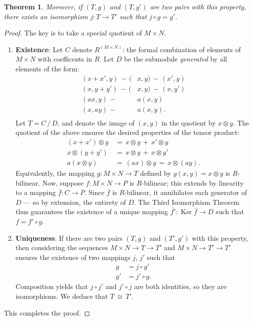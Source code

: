 \documentclass[11pt]{article}
\newtheorem{theorem}{Theorem}
\newcommand{\Ker}{\operatorname{Ker}}
\begin{document}
\begin{adjustwidth}{0.5cm}{}
\begin{theorem}
    Moreover, if $(T, g)$ and $(T, g')$ are two pairs with this property, there exists an isomorphism $j : T \to T'$ such that $j \circ g = g'$.
  \end{theorem}
  \begin{proof}
    The key is to take a special quotient of $M \times N$.
    \begin{enumerate}
      \item \textbf{Existence}: Let $C$ denote $R^{(M \times N)}$: the formal combination of elements of $M \times N$ with coefficents in $R$. Let $D$ be the submodule \textit{generated} by all elements of the form:
      \begin{align*}
        (x + x', y) \, - \, (& x, y) \, - \, (x', y) \\
        (x, y + y') \, - \, (& x, y) \, - \, (x, y') \\
        (ax, y) \, - \, & a(x, y) \\
        (x, ay) \, - \, & a(x, y). \\
      \end{align*}
      Let $T = C \, / \, D$, and denote the image of $(x, y)$ in the quotient by $x \otimes y$. The quotient of the above ensures the desired properties of the tensor product:
      \begin{align*}
        (x + x') \otimes y \, &= \, x \otimes y \, + \, x' \otimes y \\
        x \otimes (y + y') \, &= \, x \otimes y \, + \, x \otimes y' \\
            a(x \otimes y) \, &= \, (ax) \otimes y \, = \, x \otimes (ay).
      \end{align*}
      Equivalently, the mapping $g : M \times N \to T$ defined by $g(x, y) = x \otimes y$ is $R$-bilinear.
      Now, suppose $f : M \times N \to P$ is $R$-bilinear; this extends by linearity to a mapping $\bar{f} : C \to P$. Since $\bar{f}$ is $R$-bilinear, it annihilates each generator of $D$ --- so by extension, the entirety of $D$. The Third Isomorphism Theorem thus guarantees the existence of a unique mapping $\bar{f'} : \Ker \bar{f} \to D$ such that $f = f' \circ g$.

      \item \textbf{Uniqueness}: If there are two pairs $(T, g)$ and $(T', g')$ with this property, then considering the sequences $M \times N \to T \to T'$ and $M \times N \to T' \to T'$ ensures the existence of two mappings $j$, $j'$ such that
      \begin{align*}
         g &= j \circ g' \\
        g' &= j' \circ g.
      \end{align*}
      Composition yields that $j \circ j'$ and $j' \circ j$ are both identities, so they are isomorphisms. We deduce that $T \, \cong \, T'$.
    \end{enumerate} 
    This completes the proof.
  \end{proof} 
\end{adjustwidth} 

\end{document}
